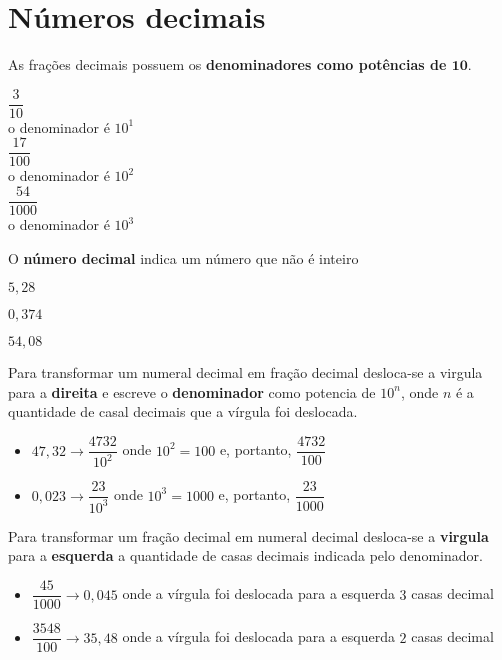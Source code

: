 \section{Números decimais}

As frações decimais possuem os \textbf{denominadores como potências de $ \textbf{10} $}.\\

\begin{multicols}{3}
	$ \dfrac{3}{10} $ \\ o denominador é $ 10^1 $\\
	
	\columnbreak
	$ \dfrac{17}{100} $ \\ o denominador é $ 10^2 $\\
	
	\columnbreak
	$ \dfrac{54}{1000} $ \\ o denominador é $ 10^3 $\\
	
\end{multicols}
 O \textbf{número decimal} indica um número que não é inteiro \\
 
 \begin{multicols}{3}
 	$ 5,28 $
 	
 	\columnbreak 
 	$ 0,374 $
 	
 	\columnbreak 
 	$ 54,08 $ 	
 \end{multicols}

Para transformar um numeral decimal em fração decimal desloca-se a virgula para a \textbf{direita} e escreve o \textbf{denominador} como potencia de $ 10^n $, onde $ n $ é a quantidade de casal decimais que a vírgula foi deslocada.

\begin{itemize}
	\item $ 47,32 \longrightarrow \dfrac{4732}{10^2} $ onde $ 10^2 = 100 $ e, portanto, $ \dfrac{4732}{100} $
	\item $ 0,023 \longrightarrow \dfrac{23}{10^3} $ onde $ 10^3 = 1000 $ e, portanto, $ \dfrac{23}{1000} $ \\
\end{itemize}

Para transformar um fração decimal em numeral decimal desloca-se a \textbf{virgula} para a \textbf{esquerda} a quantidade de casas decimais indicada pelo denominador.

\begin{itemize}
	\item $ \dfrac{45}{1000} \longrightarrow 0,045 $ onde a vírgula foi deslocada para a esquerda $ 3 $ casas decimal
	\item $ \dfrac{3548}{100} \longrightarrow 35,48 $ onde a vírgula foi deslocada para a esquerda $ 2 $ casas decimal
\end{itemize}

